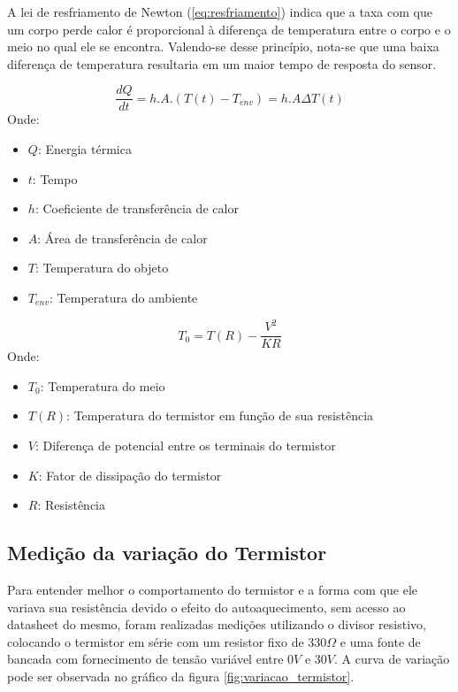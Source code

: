 A lei de resfriamento de Newton (\ref{eq:resfriamento}) indica que a taxa com que um corpo perde calor é proporcional à diferença de temperatura entre o corpo e o meio  no qual ele se encontra. Valendo-se desse princípio, nota-se que uma baixa diferença de temperatura resultaria em um maior tempo de resposta do sensor. 
 
  
\begin{equation} \label{eq:resfriamento}
	\dfrac{dQ}{dt} = h.A.(T(t) - T_{env}) = h.A \Delta T(t)	
\end{equation}
Onde:
\begin{itemize}[label=]
	\item $Q$: Energia térmica
	\item $t$: Tempo
	\item $h$: Coeficiente de transferência de calor
	\item $A$: Área de transferência de calor
	\item $T$: Temperatura do objeto
	\item $T_{env}$: Temperatura do ambiente
\end{itemize}
 
\begin{equation} \label{eq:autoAquecimento}
	T_0 = T(R) - \dfrac{V^2}{KR}
\end{equation}
Onde:
\begin{itemize}[label=]
	\item $T_0$: Temperatura do meio
 	\item $T(R)$: Temperatura do termistor em função de sua resistência
 	\item $V$: Diferença de potencial entre os terminais do termistor
 	\item $K$: Fator de dissipação do termistor
 	\item $R$: Resistência
\end{itemize}
 
\subsection{Medição da variação do Termistor}

Para entender melhor o comportamento do termistor e a forma com que ele variava sua resistência devido o efeito do autoaquecimento, sem acesso ao datasheet do mesmo, foram realizadas medições utilizando o divisor resistivo, colocando o termistor em série com um resistor fixo de $330\Omega$ e uma fonte de bancada com fornecimento de tensão variável entre $0V$ e $30V$. A curva de variação pode ser observada no gráfico da figura \ref{fig:variacao_termistor}.

